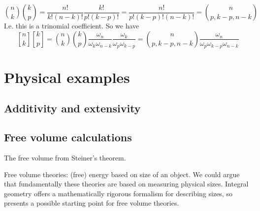 \documentclass[12pt]{report}
\begin{document}
\begin{equation*}
  {n \choose k} {k \choose p}
  =
  \frac{n!}{k!(n-k)!}
  \frac{k!}{p!(k-p)!}
  =
  \frac{n!}{p!(k-p)!(n-k)!}
  =
  {n \choose p, k-p, n-k}
\end{equation*}
I.e. this is a trinomial coefficient.
So we have
\begin{equation*}
  {n \brack k} {k \brack p}
  =
  {n \choose k}
  {k \choose p}
  \frac{\omega_n}{\omega_k \omega_{n-k}}
  \frac{\omega_k}{\omega_p \omega_{k-p}}
  =
  {n \choose p, k-p, n-k}
  \frac{\omega_n}{\omega_p \omega_{k-p} \omega_{n-k}}
\end{equation*}

\section{Physical examples}

\subsection{Additivity and extensivity}

\subsection{Free volume calculations}

The free volume from Steiner's theorem.

Free volume theories: (free) energy based on size of an object.
We could argue that fundamentally these theories are based on measuring physical sizes.
Integral geometry offers a mathematically rigorous formalism for describing sizes, so presents a possible starting point for free volume theories.
\end{document}
